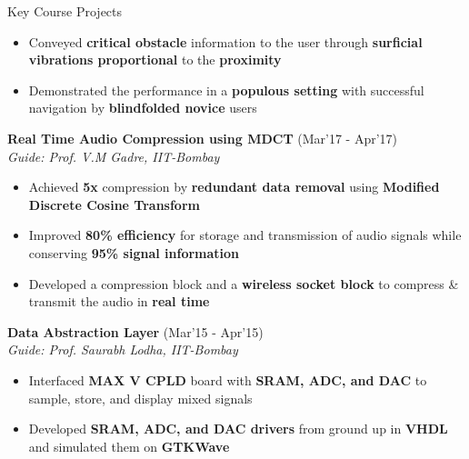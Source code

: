 \documentclass{resume}
\newcommand{\sepval}{-0.5em}
\begin{document}
\begin{rSection}{Key Course Projects}
\begin{itemize}[leftmargin=*]
	\item Conveyed {\bf critical obstacle} information to the user through {\bf surficial vibrations proportional} to the {\bf proximity}

	\item Demonstrated the performance in a {\bf populous setting} with successful navigation by {\bf blindfolded novice} users

\end{itemize}


\item {\bf{Real Time Audio Compression using MDCT}} \hfill{(Mar'17 - Apr'17)}\\

\emph{Guide: Prof. V.M Gadre, IIT-Bombay}\\ 
[-0.6cm]

\begin{itemize}[leftmargin=*]

	\itemsep \sepval

	\item Achieved {\bf 5x} compression by {\bf redundant data removal} using {\bf{Modified Discrete Cosine Transform}}

	\item Improved {\bf 80\% efficiency} for storage and transmission of audio signals while conserving {\bf 95\% signal information}
	
	\item Developed a compression block and a {\bf wireless socket block} to compress \& transmit the audio in {\bf real time}

\end{itemize}

\item {\bf Data Abstraction Layer} \hfill {(Mar'15 - Apr'15)}\\

\emph{Guide: Prof. Saurabh Lodha, IIT-Bombay}\\ 
[-0.6cm]

\begin{itemize}[leftmargin=*]

	\itemsep \sepval

	\item Interfaced {\bf MAX V CPLD} board with {\bf SRAM, ADC, and DAC} to sample, store, and display mixed signals

	\item Developed {\bf SRAM, ADC, and DAC drivers} from ground up in {\bf VHDL} and simulated them on {\bf GTKWave}


\end{itemize}
\end{rSection}
\end{document}
